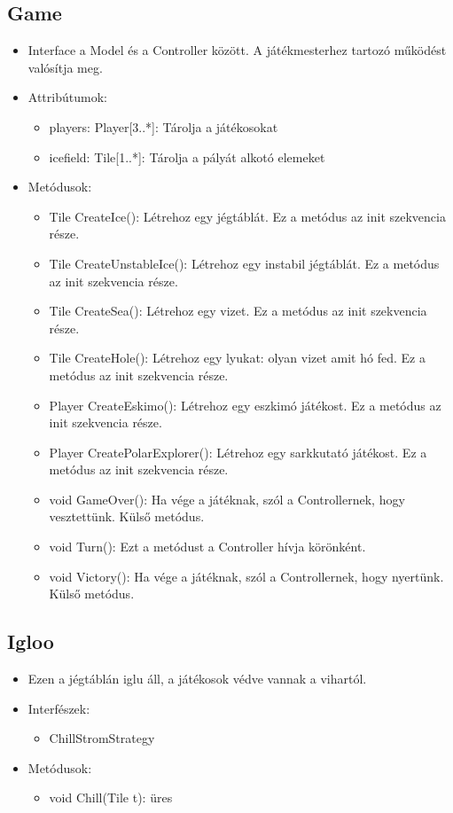 \subsection{Game}
\begin{itemize}
	\item Interface a Model és a Controller között. A játékmesterhez tartozó működést valósítja meg.	
	\item Attribútumok:
	\begin{itemize}
		\item players: Player[3..*]: Tárolja a játékosokat
		\item icefield: Tile[1..*]: Tárolja a pályát alkotó elemeket
	\end{itemize}
	\item Metódusok:
	\begin{itemize}
		\item Tile CreateIce(): Létrehoz egy jégtáblát. Ez a metódus az init szekvencia része.
		\item Tile CreateUnstableIce(): Létrehoz egy instabil jégtáblát. Ez a metódus az init szekvencia része.
		\item Tile CreateSea(): Létrehoz egy vizet. Ez a metódus az init szekvencia része.
		\item Tile CreateHole(): Létrehoz egy lyukat: olyan vizet amit hó fed. Ez a metódus az init szekvencia része.
		\item Player CreateEskimo(): Létrehoz egy eszkimó játékost. Ez a metódus az init szekvencia része.
		\item Player CreatePolarExplorer(): Létrehoz egy sarkkutató játékost. Ez a metódus az init szekvencia része.
		\item void GameOver(): Ha vége a játéknak, szól a Controllernek, hogy vesztettünk. Külső metódus.
		\item void Turn(): Ezt a metódust a Controller hívja körönként. 
		\item void Victory(): Ha vége a játéknak, szól a Controllernek, hogy nyertünk. Külső metódus.
	\end{itemize}
\end{itemize}

\subsection{Igloo}
\begin{itemize}
	\item Ezen a jégtáblán iglu áll, a játékosok védve vannak a vihartól.	
	\item Interfészek:
	\begin{itemize} 
		\item ChillStromStrategy
	\end{itemize}
	\item Metódusok:
	\begin{itemize}
		\item void Chill(Tile t): üres
	\end{itemize}
\end{itemize}

